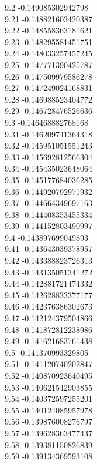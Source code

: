 {9.2	-0.149085302942798\\
9.21	-0.148821603420387\\
9.22	-0.148558363181621\\
9.23	-0.148295581451751\\
9.24	-0.148033257457245\\
9.25	-0.147771390425787\\
9.26	-0.147509979586278\\
9.27	-0.147249024168831\\
9.28	-0.146988523404772\\
9.29	-0.146728476526636\\
9.3	-0.146468882768168\\
9.31	-0.146209741364318\\
9.32	-0.145951051551243\\
9.33	-0.145692812566304\\
9.34	-0.145435023648064\\
9.35	-0.145177684036285\\
9.36	-0.144920792971932\\
9.37	-0.144664349697163\\
9.38	-0.144408353455334\\
9.39	-0.144152803490997\\
9.4	-0.143897699049893\\
9.41	-0.143643039378957\\
9.42	-0.143388823726313\\
9.43	-0.143135051341272\\
9.44	-0.142881721474332\\
9.45	-0.142628833377177\\
9.46	-0.142376386302673\\
9.47	-0.142124379504866\\
9.48	-0.141872812238986\\
9.49	-0.141621683761438\\
9.5	-0.141370993329805\\
9.51	-0.141120740202847\\
9.52	-0.140870923640495\\
9.53	-0.140621542903855\\
9.54	-0.140372597255201\\
9.55	-0.140124085957978\\
9.56	-0.139876008276797\\
9.57	-0.139628363477437\\
9.58	-0.139381150826839\\
9.59	-0.139134369593108\\
}
